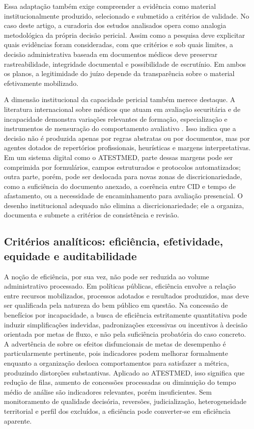 \documentclass[12pt,a4paper]{article}
\begin{document}
Essa adaptação também exige compreender a evidência como material institucionalmente produzido, selecionado e submetido a critérios de validade. No caso deste artigo, a curadoria dos estudos analisados opera como analogia metodológica da própria decisão pericial. Assim como a pesquisa deve explicitar quais evidências foram consideradas, com que critérios e sob quais limites, a decisão administrativa baseada em documentos médicos deve preservar rastreabilidade, integridade documental e possibilidade de escrutínio. Em ambos os planos, a legitimidade do juízo depende da transparência sobre o material efetivamente mobilizado.

A dimensão institucional da capacidade pericial também merece destaque. A literatura internacional sobre médicos que atuam em avaliação securitária e de incapacidade demonstra variações relevantes de formação, especialização e instrumentos de mensuração do comportamento avaliativo \parencite{steenbeek2011thedevelopmentofinstrumentstomeasuretheworkdisa}. Isso indica que a decisão não é produzida apenas por regras abstratas ou por documentos, mas por agentes dotados de repertórios profissionais, heurísticas e margens interpretativas. Em um sistema digital como o ATESTMED, parte dessas margens pode ser comprimida por formulários, campos estruturados e protocolos automatizados; outra parte, porém, pode ser deslocada para novas zonas de discricionariedade, como a suficiência do documento anexado, a coerência entre CID e tempo de afastamento, ou a necessidade de encaminhamento para avaliação presencial. O desenho institucional adequado não elimina a discricionariedade; ele a organiza, documenta e submete a critérios de consistência e revisão.

\subsection{Critérios analíticos: eficiência, efetividade, equidade e auditabilidade}
\label{sec:orgffcb716}

A noção de eficiência, por sua vez, não pode ser reduzida ao volume administrativo processado. Em políticas públicas, eficiência envolve a relação entre recursos mobilizados, processos adotados e resultados produzidos, mas deve ser qualificada pela natureza do bem público em questão. Na concessão de benefícios por incapacidade, a busca de eficiência estritamente quantitativa pode induzir simplificações indevidas, padronizações excessivas ou incentivos à decisão orientada por metas de fluxo, e não pela suficiência probatória do caso concreto. A advertência de \textcite{kelman2009performanceimprovementandperformancedysfunctionanemp} sobre os efeitos disfuncionais de metas de desempenho é particularmente pertinente, pois indicadores podem melhorar formalmente enquanto a organização desloca comportamentos para satisfazer a métrica, produzindo distorções substantivas. Aplicado ao ATESTMED, isso significa que redução de filas, aumento de concessões processadas ou diminuição do tempo médio de análise são indicadores relevantes, porém insuficientes. Sem monitoramento de qualidade decisória, reversões, judicialização, heterogeneidade territorial e perfil dos excluídos, a eficiência pode converter-se em eficiência aparente.
\end{document}
